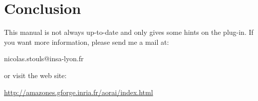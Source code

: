 \documentclass{report}
\begin{document}
\chapter{Conclusion}
This manual is not always up-to-date and only gives some hints on the \aorai 
plug-in. If you want more information, please send me a mail at:

\begin{center}
  nicolas.stouls@insa-lyon.fr
\end{center}

or visit the web site:

\begin{center}
  \url{http://amazones.gforge.inria.fr/aorai/index.html}
\end{center}
\end{document}
